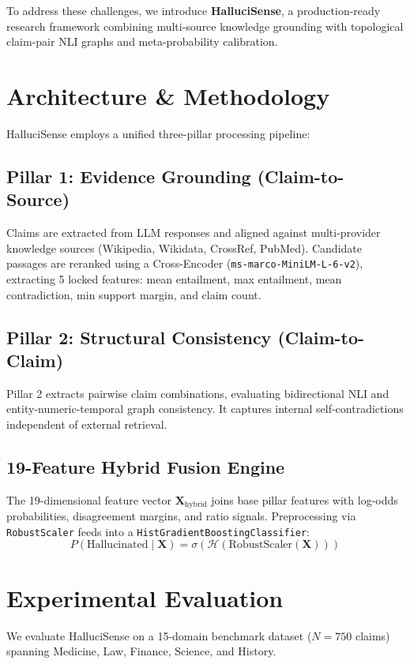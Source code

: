 \documentclass[conference]{IEEEtran}
\begin{document}
To address these challenges, we introduce \textbf{HalluciSense}, a production-ready research framework combining multi-source knowledge grounding with topological claim-pair NLI graphs and meta-probability calibration.

\section{Architecture \& Methodology}
HalluciSense employs a unified three-pillar processing pipeline:

\subsection{Pillar 1: Evidence Grounding (Claim-to-Source)}
Claims are extracted from LLM responses and aligned against multi-provider knowledge sources (Wikipedia, Wikidata, CrossRef, PubMed). Candidate passages are reranked using a Cross-Encoder (\texttt{ms-marco-MiniLM-L-6-v2}), extracting 5 locked features: mean entailment, max entailment, mean contradiction, min support margin, and claim count.

\subsection{Pillar 2: Structural Consistency (Claim-to-Claim)}
Pillar 2 extracts pairwise claim combinations, evaluating bidirectional NLI and entity-numeric-temporal graph consistency. It captures internal self-contradictions independent of external retrieval.

\subsection{19-Feature Hybrid Fusion Engine}
The 19-dimensional feature vector $\mathbf{X}_{\text{hybrid}}$ joins base pillar features with log-odds probabilities, disagreement margins, and ratio signals. Preprocessing via \texttt{RobustScaler} feeds into a \texttt{HistGradientBoostingClassifier}:
\begin{equation}
P(\text{Hallucinated} \mid \mathbf{X}) = \sigma\left( \mathcal{H}(\text{RobustScaler}(\mathbf{X})) \right)
\end{equation}

\section{Experimental Evaluation}
We evaluate HalluciSense on a 15-domain benchmark dataset ($N=750$ claims) spanning Medicine, Law, Finance, Science, and History.
\end{document}
